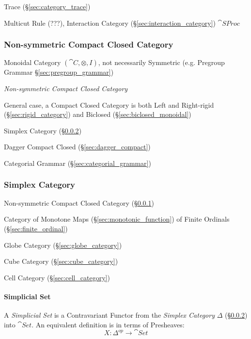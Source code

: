 Trace (\S\ref{sec:category_trace})

Multicut Rule (???), Interaction Category
(\S\ref{sec:interaction_category}) $\cat{SProc}$



\subsubsection{Non-symmetric Compact Closed Category}
\label{sec:nonsymmetric_compact_closed}

Monoidal Category $(\cat{C}, \otimes, I)$, not necessarily Symmetric
(e.g. Pregroup Grammar \S\ref{sec:pregroup_grammar})

\emph{Non-symmetric Compact Closed Category}

General case, a Compact Closed Category is both Left and Right-rigid
(\S\ref{sec:rigid_category}) and Biclosed
(\S\ref{sec:biclosed_monoidal})

Simplex Category (\S\ref{sec:simplex_category})

Dagger Compact Closed (\S\ref{sec:dagger_compact})

Categorial Grammar (\S\ref{sec:categorial_grammar})



\subsubsection{Simplex Category}\label{sec:simplex_category}

Non-symmetric Compact Closed Category
(\S\ref{sec:nonsymmetric_compact_closed})

Category of Monotone Maps (\S\ref{sec:monotonic_function}) of Finite
Ordinals (\S\ref{sec:finite_ordinal})

\fist Globe Category (\S\ref{sec:globe_category})

\fist Cube Category (\S\ref{sec:cube_category})

\fist Cell Category (\S\ref{sec:cell_category})



\paragraph{Simplicial Set}\label{sec:simplicial_set}\hfill

A \emph{Simplicial Set} is a Contravariant Functor from the
\emph{Simplex Category} $\Delta$ (\S\ref{sec:simplex_category}) into
$\cat{Set}$. An equivalent definition is in terms of Presheaves:
\[
  X: \Delta^{op} \rightarrow \cat{Set}
\]



